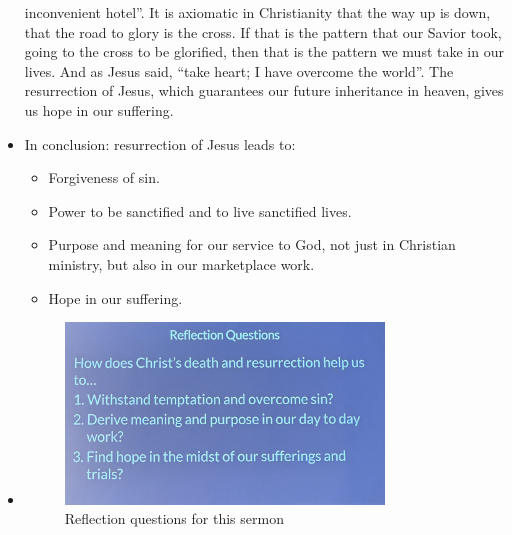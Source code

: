 \begin{itemize}
{  inconvenient hotel''. It is axiomatic in Christianity that the way up is down, that the road to glory is the cross. If that is the pattern that our Savior took, going to the cross to be glorified, then that is the pattern we must take in our lives. And as Jesus said, ``take heart; I have overcome the world''. The resurrection of Jesus, which guarantees our future inheritance in heaven, gives us hope in our suffering. }
  \item{In conclusion: resurrection of Jesus leads to:
  \begin{itemize}
    \item{Forgiveness of sin.}
    \item{Power to be sanctified and to live sanctified lives.}
    \item{Purpose and meaning for our service to God, not just in Christian ministry, but also in our marketplace work.}
    \item{Hope in our suffering.}
  \end{itemize}
  }
  \item{\begin{figure}[H]
    \centering
    \includegraphics[width=0.8\textwidth, trim={0cm 0cm 0cm 0cm},clip]{Figures/aprilSermon2Reflections.jpg}
    \caption[]{Reflection questions for this sermon}
  \end{figure}}
\end{itemize}